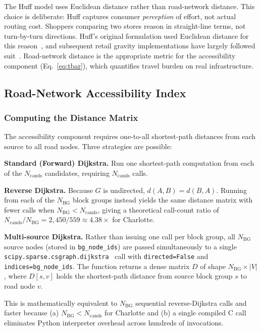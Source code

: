 \documentclass[conference]{IEEEtran}
\begin{document}
The Huff model uses Euclidean distance rather than road-network
distance.  This choice is deliberate: Huff captures consumer
\textit{perception} of effort, not actual routing cost.  Shoppers
comparing two stores reason in straight-line terms, not turn-by-turn
directions.  Huff's original formulation used Euclidean distance for
this reason~\cite{Huff1964}, and subsequent retail gravity
implementations have largely followed suit~\cite{Suhara2019,
Liang2020}.  Road-network distance is the appropriate metric for the
accessibility component (Eq.~\ref{eq:tbar}), which quantifies travel
burden on real infrastructure.

\subsection{Road-Network Accessibility Index}
\label{sec:sssp}

\subsubsection{Computing the Distance Matrix}

The accessibility component requires one-to-all shortest-path
distances from each source to all road nodes.  Three strategies are
possible:

\textbf{Standard (Forward) Dijkstra.}  Run one shortest-path
computation from each of the $N_{\text{cands}}$ candidates, requiring
$N_{\text{cands}}$ calls.

\textbf{Reverse Dijkstra.}  Because $G$ is undirected, $d(A,B) =
d(B,A)$.  Running from each of the $N_{\text{BG}}$ block groups
instead yields the same distance matrix with fewer calls when
$N_{\text{BG}} < N_{\text{cands}}$, giving a theoretical call-count
ratio of $N_{\text{cands}}/N_{\text{BG}} = 2{,}450/559 \approx 4.38\times$
for Charlotte.

\textbf{Multi-source Dijkstra.}  Rather than issuing one call per
block group, all $N_{\text{BG}}$ source nodes (stored in
\texttt{bg\_node\_ids}) are passed simultaneously to a single
\texttt{scipy.sparse.csgraph.dijkstra}~\cite{Virtanen2020} call with
\texttt{directed=False} and \texttt{indices=bg\_node\_ids}.  The
function returns a dense matrix $D$ of shape $N_{\text{BG}} \times
|V|$, where $D[s, v]$ holds the shortest-path distance from source
block group $s$ to road node $v$.

This is mathematically equivalent to $N_{\text{BG}}$ sequential reverse-Dijkstra calls and faster because (a) $N_{\text{BG}} < N_{\text{cands}}$ for Charlotte and (b) a single compiled C call eliminates Python interpreter overhead across hundreds of invocations.
\end{document}
